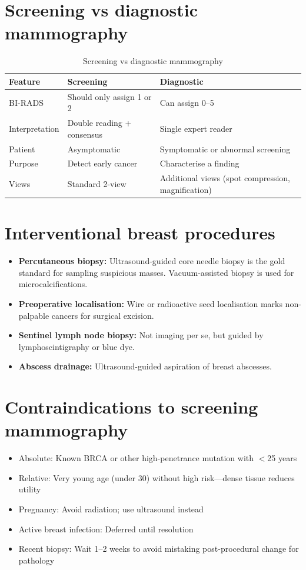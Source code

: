 \section{Screening vs diagnostic mammography}

\begin{table}[h]
\centering
\caption{Screening vs diagnostic mammography}
\label{tab:screen_vs_diag}
\begin{tabular}{@{}p{}p{}p{}@{}}
\hline
\textbf{Feature} & \textbf{Screening} & \textbf{Diagnostic} \\
\hline
BI-RADS & Should only assign 1 or 2 & Can assign 0--5 \\
Interpretation & Double reading + consensus & Single expert reader \\
Patient & Asymptomatic & Symptomatic or abnormal screening \\
Purpose & Detect early cancer & Characterise a finding \\
Views & Standard 2-view & Additional views (spot compression, magnification) \\
\hline
\end{tabular}
\end{table}

\section{Interventional breast procedures}
\begin{itemize}
    \item \textbf{Percutaneous biopsy:} Ultrasound-guided core needle biopsy is the gold standard for sampling suspicious masses. Vacuum-assisted biopsy is used for microcalcifications.
    \item \textbf{Preoperative localisation:} Wire or radioactive seed localisation marks non-palpable cancers for surgical excision.
    \item \textbf{Sentinel lymph node biopsy:} Not imaging per se, but guided by lymphoscintigraphy or blue dye.
    \item \textbf{Abscess drainage:} Ultrasound-guided aspiration of breast abscesses.
\end{itemize}

\section{Contraindications to screening mammography}
\begin{itemize}
    \item Absolute: Known BRCA or other high-penetrance mutation with $<$25 years
    \item Relative: Very young age (under 30) without high risk---dense tissue reduces utility
    \item Pregnancy: Avoid radiation; use ultrasound instead
    \item Active breast infection: Deferred until resolution
    \item Recent biopsy: Wait 1--2 weeks to avoid mistaking post-procedural change for pathology
\end{itemize}

